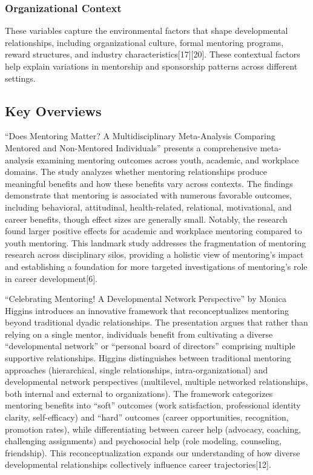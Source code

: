 \documentclass[
  letterpaper,
  DIV=11,
  numbers=noendperiod]{scrartcl}
\begin{document}
\subsubsection{Organizational Context}\label{organizational-context}

These variables capture the environmental factors that shape
developmental relationships, including organizational culture, formal
mentoring programs, reward structures, and industry
characteristics{[}17{]}{[}20{]}. These contextual factors help explain
variations in mentorship and sponsorship patterns across different
settings.

\subsection{Key Overviews}\label{key-overviews}

``Does Mentoring Matter? A Multidisciplinary Meta-Analysis Comparing
Mentored and Non-Mentored Individuals'' presents a comprehensive
meta-analysis examining mentoring outcomes across youth, academic, and
workplace domains. The study analyzes whether mentoring relationships
produce meaningful benefits and how these benefits vary across contexts.
The findings demonstrate that mentoring is associated with numerous
favorable outcomes, including behavioral, attitudinal, health-related,
relational, motivational, and career benefits, though effect sizes are
generally small. Notably, the research found larger positive effects for
academic and workplace mentoring compared to youth mentoring. This
landmark study addresses the fragmentation of mentoring research across
disciplinary silos, providing a holistic view of mentoring's impact and
establishing a foundation for more targeted investigations of
mentoring's role in career development{[}6{]}.

``Celebrating Mentoring! A Developmental Network Perspective'' by Monica
Higgins introduces an innovative framework that reconceptualizes
mentoring beyond traditional dyadic relationships. The presentation
argues that rather than relying on a single mentor, individuals benefit
from cultivating a diverse ``developmental network'' or ``personal board
of directors'' comprising multiple supportive relationships. Higgins
distinguishes between traditional mentoring approaches (hierarchical,
single relationships, intra-organizational) and developmental network
perspectives (multilevel, multiple networked relationships, both
internal and external to organizations). The framework categorizes
mentoring benefits into ``soft'' outcomes (work satisfaction,
professional identity clarity, self-efficacy) and ``hard'' outcomes
(career opportunities, recognition, promotion rates), while
differentiating between career help (advocacy, coaching, challenging
assignments) and psychosocial help (role modeling, counseling,
friendship). This reconceptualization expands our understanding of how
diverse developmental relationships collectively influence career
trajectories{[}12{]}.
\end{document}
